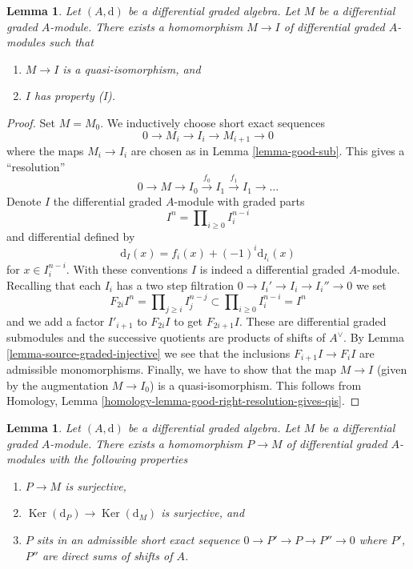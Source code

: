\documentclass{stacks-project}
\theoremstyle{plain}
\newtheorem{lemma}[subsection]{Lemma}
\theoremstyle{definition}
\theoremstyle{remark}
\numberwithin{equation}{subsection}
\def\Ker{\mathop{\mathrm{Ker}}}
\begin{document}
\begin{lemma}
\label{lemma-right-resolution}
Let $(A, \text{d})$ be a differential graded algebra.
Let $M$ be a differential graded $A$-module. There exists a homomorphism
$M \to I$ of differential graded $A$-modules such that
\begin{enumerate}
\item $M \to I$ is a quasi-isomorphism, and
\item $I$ has property (I).
\end{enumerate}
\end{lemma}

\begin{proof}
Set $M = M_0$. We inductively choose short exact sequences
$$
0 \to M_i \to I_i \to M_{i + 1} \to 0
$$
where the maps $M_i \to I_i$ are chosen as in Lemma \ref{lemma-good-sub}.
This gives a ``resolution''
$$
0 \to M \to I_0 \xrightarrow{f_0} I_1 \xrightarrow{f_1} I_1 \to \ldots
$$
Denote $I$ the differential graded $A$-module with graded parts
$$
I^n = \prod\nolimits_{i \geq 0} I^{n - i}_i
$$
and differential defined by
$$
\text{d}_I(x) = f_i(x) + (-1)^i \text{d}_{I_i}(x)
$$
for $x \in I_i^{n - i}$. With these conventions $I$ is indeed a differential
graded $A$-module. Recalling that each $I_i$ has a two step filtration
$0 \to I_i' \to I_i \to I_i'' \to 0$ we set
$$
F_{2i}I^n = \prod\nolimits_{j \geq i} I^{n - j}_j
\subset
\prod\nolimits_{i \geq 0} I^{n - i}_i = I^n
$$
and we add a factor $I'_{i + 1}$ to $F_{2i}I$ to get $F_{2i + 1}I$.
These are differential graded submodules and the successive quotients
are products of shifts of $A^\vee$. By
Lemma \ref{lemma-source-graded-injective} we see that
the inclusions $F_{i + 1}I \to F_iI$ are admissible monomorphisms.
Finally, we have to show that the map $M \to I$ (given by the
augmentation $M \to I_0$) is a quasi-isomorphism. This follows from
Homology, Lemma \ref{homology-lemma-good-right-resolution-gives-qis}.
\end{proof}

\begin{lemma}
\label{lemma-good-quotient}
Let $(A, \text{d})$ be a differential graded algebra.
Let $M$ be a differential graded $A$-module. There exists a homomorphism
$P \to M$ of differential graded $A$-modules with the following
properties
\begin{enumerate}
\item $P \to M$ is surjective,
\item $\Ker(\text{d}_P) \to \Ker(\text{d}_M)$ is surjective, and
\item $P$ sits in an admissible short exact sequence
$0 \to P' \to P \to P'' \to 0$ where $P'$, $P''$ are direct sums
of shifts of $A$.
\end{enumerate}
\end{lemma}
\end{document}
